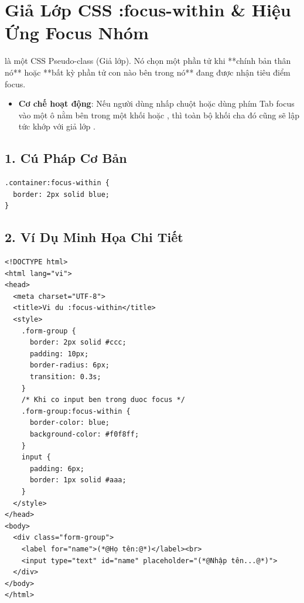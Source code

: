 \section{Giả Lớp CSS :focus-within \& Hiệu Ứng Focus Nhóm}
\label{sec:css_focus_within}

\begin{conceptBox}
 là một CSS Pseudo-class (Giả lớp). Nó chọn một phần tử khi **chính bản thân nó** hoặc **bất kỳ phần tử con nào bên trong nó** đang được nhận tiêu điểm focus.
\par\vspace{4pt}
\begin{itemize}[leftmargin=1.5em, itemsep=2pt, parsep=0pt]
    \item \textbf{Cơ chế hoạt động}: Nếu người dùng nhấp chuột hoặc dùng phím Tab focus vào một ô  nằm bên trong một khối  hoặc , thì toàn bộ khối cha đó cũng sẽ lập tức khớp với giả lớp .
\end{itemize}
\end{conceptBox}

\subsection{1. Cú Pháp Cơ Bản}
\begin{codeWindow}
\begin{lstlisting}[language=HTML5]
.container:focus-within {
  border: 2px solid blue;
}
\end{lstlisting}
\end{codeWindow}

\subsection{2. Ví Dụ Minh Họa Chi Tiết}

\begin{codeWindow}
\begin{lstlisting}[language=HTML5]
<!DOCTYPE html>
<html lang="vi">
<head>
  <meta charset="UTF-8">
  <title>Vi du :focus-within</title>
  <style>
    .form-group {
      border: 2px solid #ccc;
      padding: 10px;
      border-radius: 6px;
      transition: 0.3s;
    }
    /* Khi co input ben trong duoc focus */
    .form-group:focus-within {
      border-color: blue;
      background-color: #f0f8ff;
    }
    input {
      padding: 6px;
      border: 1px solid #aaa;
    }
  </style>
</head>
<body>
  <div class="form-group">
    <label for="name">(*@Họ tên:@*)</label><br>
    <input type="text" id="name" placeholder="(*@Nhập tên...@*)">
  </div>
</body>
</html>
\end{lstlisting}
\end{codeWindow}


